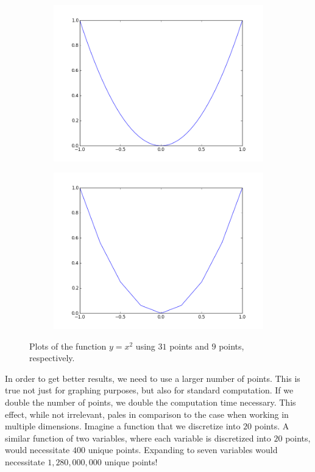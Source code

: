 \begin{figure}
\begin{subfigure}{.5\textwidth}
\includegraphics[width=\textwidth]{x2.png}
\end{subfigure}
\begin{subfigure}{.5\textwidth}
\includegraphics[width=\textwidth]{x2a.png}
\end{subfigure}
\caption{Plots of the function $y=x^2$ using $31$ points and $9$ points, respectively.}
\label{fig:x_squared}
\end{figure}

In order to get better results, we need to use a larger number of points.  This is true not just for graphing purposes, but also for standard computation.  If we double the number of points, we double the computation time necessary.  This effect, while not irrelevant, pales in comparison to the case when working in multiple dimensions.  Imagine a function that we discretize into $20$ points.  A similar function of two variables, where each variable is discretized into $20$ points, would necessitate $400$ unique points.  Expanding to seven variables would necessitate $1,280,000,000$ unique points!

